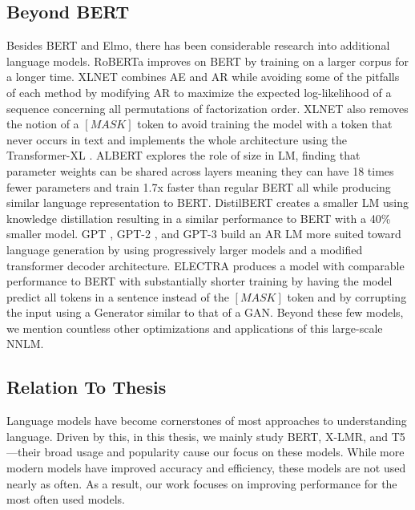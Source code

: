 \subsection{Beyond BERT}
Besides BERT and Elmo, there has been considerable research into additional language models. RoBERTa \cite{Liu2019RoBERTaAR} improves on BERT by training on a larger corpus for a longer time. XLNET \cite{Yang2019XLNetGA} combines AE and AR while avoiding some of the pitfalls of each method by modifying AR to maximize the expected log-likelihood of a sequence concerning all permutations of factorization order. XLNET also removes the notion of a $[MASK]$ token to avoid training the model with a token that never occurs in text and implements the whole architecture using the Transformer-XL \cite{Dai2019TransformerXLAL}. ALBERT \cite{Lan2019ALBERTAL} explores the role of size in LM, finding that parameter weights can be shared across layers meaning they can have 18 times fewer parameters and train 1.7x faster than regular BERT all while producing similar language representation to BERT. DistilBERT \cite{Sanh2019DistilBERTAD} creates a smaller LM using knowledge distillation resulting in a similar performance to BERT with a 40\% smaller model. GPT \cite{Radford2018ImprovingLU}, GPT-2 \cite{Radford2019LanguageMA}, and GPT-3 \cite{Brown2020LanguageMA}  build an AR LM more suited toward language generation by using progressively larger models and a modified transformer decoder architecture. ELECTRA \cite{Clark2020ELECTRAPT} produces a model with comparable performance to BERT with substantially shorter training by having the model predict all tokens in a sentence instead of the $[MASK]$ token and by corrupting the input using a Generator similar to that of a GAN. Beyond these few models, we mention countless other optimizations and applications of this large-scale NNLM. 
\subsection{Relation To Thesis}
Language models have become cornerstones of most approaches to understanding language. Driven by this, in this thesis, we mainly study BERT, X-LMR, and T5—their broad usage and popularity cause our focus on these models. While more modern models have improved accuracy and efficiency, these models are not used nearly as often. As a result, our work focuses on improving performance for the most often used models. 
